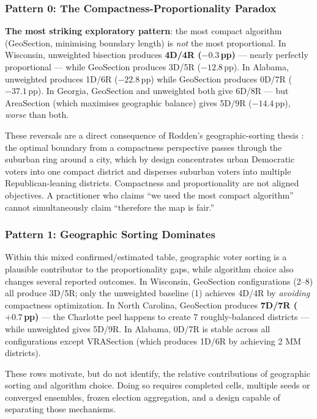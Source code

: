 \subsubsection*{Pattern 0: The Compactness-Proportionality Paradox}

\textbf{The most striking exploratory pattern}: the most compact algorithm (GeoSection,
minimising boundary length) is \emph{not} the most proportional.
In Wisconsin, unweighted bisection produces \textbf{4D/4R ($-0.3$\,pp)} — nearly
perfectly proportional — while GeoSection produces 3D/5R ($-12.8$\,pp).
In Alabama, unweighted produces 1D/6R ($-22.8$\,pp) while GeoSection produces
0D/7R ($-37.1$\,pp).
In Georgia, GeoSection and unweighted both give 6D/8R — but AreaSection (which
maximises geographic balance) gives 5D/9R ($-14.4$\,pp), \emph{worse} than both.

These reversals are a direct consequence of Rodden's geographic-sorting thesis
\citep{rodden2019}: the optimal boundary from a compactness perspective passes
through the suburban ring around a city, which by design concentrates urban
Democratic voters into one compact district and disperses suburban voters into
multiple Republican-leaning districts.
Compactness and proportionality are not aligned objectives.
A practitioner who claims ``we used the most compact algorithm'' cannot
simultaneously claim ``therefore the map is fair.''

\subsubsection*{Pattern 1: Geographic Sorting Dominates}

Within this mixed confirmed/estimated table, geographic voter sorting is a
plausible contributor to the proportionality gaps, while algorithm choice also
changes several reported outcomes.
In Wisconsin, GeoSection configurations (2--8) all produce 3D/5R; only the
unweighted baseline (1) achieves 4D/4R by \emph{avoiding} compactness optimization.
In North Carolina, GeoSection produces \textbf{7D/7R ($+0.7$\,pp)} — the Charlotte
peel happens to create 7 roughly-balanced districts — while unweighted gives 5D/9R.
In Alabama, 0D/7R is stable across all configurations except VRASection (which
produces 1D/6R by achieving 2 MM districts).

These rows motivate, but do not identify, the relative contributions of
geographic sorting and algorithm choice. Doing so requires completed cells,
multiple seeds or converged ensembles, frozen election aggregation, and a
design capable of separating those mechanisms.


